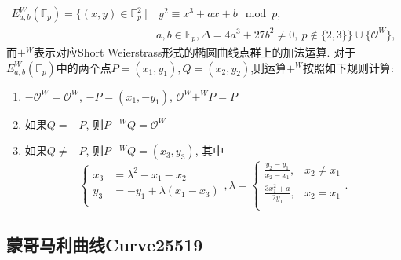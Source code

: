\documentclass{article}
\newcommand{\F}{\mathbb{F}}
\begin{document}
\begin{equation*}
\begin{split}
E_{a,b}^{W}(\F_p)= \{(x,y)\in \F_p^2\ | & \ y^2 \equiv x^3 + ax + b \mod p, \\
 & a, b \in \F_p, \Delta = 4a^3 + 27b^2 \neq 0, \ p \notin \{2,3\}\} \cup \{\mathcal{O}^W\},
\end{split}
\end{equation*}
而$+^W$表示对应Short Weierstrass形式的椭圆曲线点群上的加法运算.
对于$E_{a,b}^{W}(\F_p)$中的两个点$P=(x_1,y_1), Q = (x_2, y_2)$,则运算$+^W$按照如下规则计算:
\begin{enumerate}
\item $-\mathcal{O}^W = \mathcal{O}^W$, $-P = (x_ 1, -y_1)$, $\mathcal{O}^W +^W P = P$
\item 如果$Q = -P$, 则$P +^W Q=\mathcal{O}^W$
\item 如果$Q\neq -P$, 则$P +^W Q=(x_3,y_3)$, 其中
\begin{equation*}
\left\{
\begin{array}{ll}
x_3 &= \lambda^2 - x_1 - x_2 \\
y_3 & = -y_1 + \lambda(x_1-x_3) \\
\end{array},
\right.
\lambda = 
\left\{
\begin{array}{ll}
\frac{y_2-y_1}{x_2-x_1}, & x_2\neq x_1\\
\frac{3x_1^2+a}{2y_1}, & x_2 =  x_1\\
\end{array}.
\right.
\end{equation*}
\end{enumerate}


\subsection{蒙哥马利曲线Curve25519}
\end{document}
